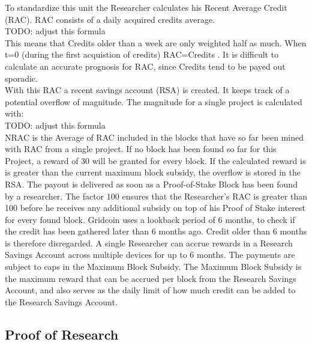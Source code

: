 To standardize this unit the Researcher calculates his Recent Average Credit (RAC). RAC consists of a daily acquired credits average.\\

TODO: adjust this formula\\

This means that Credits older than a week are only weighted half as much. When t=0 (during the first acquistion of credits) RAC=Credits . It is difficult to calculate an accurate prognosis for RAC, since Credits tend to be payed out sporadic.\\

With this RAC a recent savings account (RSA) is created. It keeps track of a potential overflow of magnitude. The magnitude for a single project is calculated with:\\

TODO: adjust this formula\\

NRAC is the Average of RAC included in the blocks that have so far been mined with RAC from a single project. If no block has been found so far for this Project, a reward of 30 will be granted for every block. If the calculated reward is is greater than the current maximum block subsidy, the overflow is stored in the RSA. The payout is delivered as soon as a Proof-of-Stake Block has been found by a researcher. The factor 100 ensures that the Researcher's RAC is greater than 100 before he receives any additional subsidy on top of his Proof of Stake interest for every found block. Gridcoin uses a lookback period of 6 months, to check if the credit has been gathered later than 6 months ago. Credit older than 6 months is therefore disregarded. A single Researcher can accrue rewards in a Research Savings Account across multiple devices for up to 6 months. The payments are subject to caps in the Maximum Block Subsidy. The Maximum Block Subsidy is the maximum reward that can be accrued per block from the Research Savings Account, and also serves as the daily limit of how much credit can be added to the Research Savings Account.

\subsection{Proof of Research}

